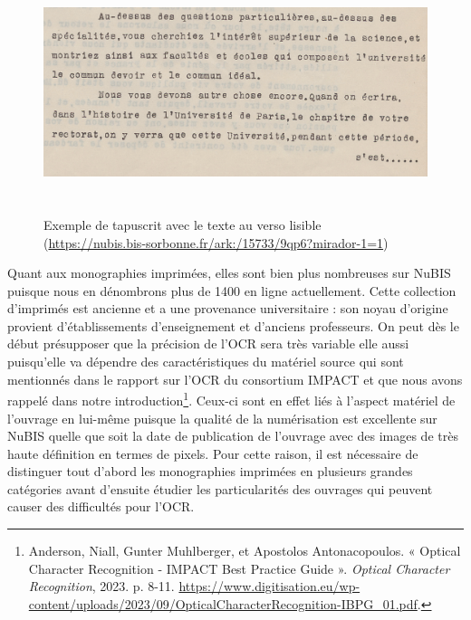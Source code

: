 \documentclass[a4paper,12pt,twoside]{book}
\begin{document}
\begin{figure} [H]
	\includegraphics[width=6.2806in,height=2.76389in]{vertopal_157ae480aa4a4b07be198b586a812241/media/image3.png}
	
	\caption{Exemple de tapuscrit avec le texte au verso lisible
	(\url{https://nubis.bis-sorbonne.fr/ark:/15733/9qp6?mirador-1=1})}
\end{figure}


Quant aux monographies imprimées, elles sont bien plus nombreuses sur
NuBIS puisque nous en dénombrons plus de 1400 en ligne actuellement.
Cette collection d'imprimés est ancienne et a une provenance
universitaire : son noyau d'origine provient d'établissements
d'enseignement et d'anciens professeurs. On peut dès le début
présupposer que la précision de l'OCR sera très variable elle aussi
puisqu'elle va dépendre des caractéristiques du matériel source qui sont
mentionnés dans le rapport sur l'OCR du consortium IMPACT et que nous
avons rappelé dans notre introduction\footnote{Anderson, Niall, Gunter
	Muhlberger, et Apostolos Antonacopoulos. « Optical Character
	Recognition - IMPACT Best Practice Guide ». \emph{Optical Character
		Recognition}, 2023. p. 8-11.
	\url{https://www.digitisation.eu/wp-content/uploads/2023/09/OpticalCharacterRecognition-IBPG_01.pdf}.}.
Ceux-ci sont en effet liés à l'aspect matériel de l'ouvrage en lui-même
puisque la qualité de la numérisation est excellente sur NuBIS quelle
que soit la date de publication de l'ouvrage avec des images de très
haute définition en termes de pixels. Pour cette raison, il est
nécessaire de distinguer tout d'abord les monographies imprimées en
plusieurs grandes catégories avant d'ensuite étudier les particularités
des ouvrages qui peuvent causer des difficultés pour l'OCR. \\
\end{document}
